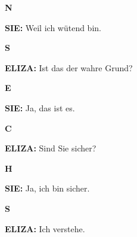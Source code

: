 \documentclass{article}
\begin{document}
\begin{minipage}[t]{0.13\textwidth}
  \centering
  {\bfseries\fontsize{14.4}{14.4}\selectfont\textcolor{pastelpink}{N}}
\end{minipage}%
\begin{minipage}[t]{0.81\textwidth}
  \textbf{SIE:} Weil ich wütend bin.
\end{minipage}

\vspace{0.5cm}

\begin{minipage}[t]{0.13\textwidth}
  \centering
  {\bfseries\fontsize{14.4}{14.4}\selectfont\textcolor{pastelpink}{S}}
\end{minipage}%
\begin{minipage}[t]{0.81\textwidth}
  \textbf{ELIZA:} Ist das der wahre Grund?
\end{minipage}

\vspace{0.5cm}

\begin{minipage}[t]{0.13\textwidth}
  \centering
  {\bfseries\fontsize{14.4}{14.4}\selectfont\textcolor{pastelpink}{E}}
\end{minipage}%
\begin{minipage}[t]{0.81\textwidth}
  \textbf{SIE:} Ja, das ist es.
\end{minipage}

\vspace{0.5cm}

\begin{minipage}[t]{0.13\textwidth}
  \centering
  {\bfseries\fontsize{14.4}{14.4}\selectfont\textcolor{pastelpink}{C}}
\end{minipage}%
\begin{minipage}[t]{0.81\textwidth}
  \textbf{ELIZA:} Sind Sie sicher?
\end{minipage}

\vspace{0.5cm}

\begin{minipage}[t]{0.13\textwidth}
  \centering
  {\bfseries\fontsize{14.4}{14.4}\selectfont\textcolor{pastelpink}{H}}
\end{minipage}%
\begin{minipage}[t]{0.81\textwidth}
  \textbf{SIE:} Ja, ich bin sicher.
\end{minipage}

\vspace{0.5cm}

\begin{minipage}[t]{0.13\textwidth}
  \centering
  {\bfseries\fontsize{14.4}{14.4}\selectfont\textcolor{pastelpink}{S}}
\end{minipage}%
\begin{minipage}[t]{0.81\textwidth}
  \textbf{ELIZA:} Ich verstehe.
\end{minipage}

\vspace{0.5cm}
\end{document}
